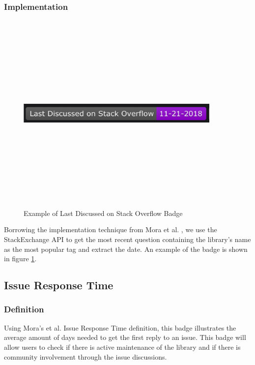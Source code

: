 \documentclass[12pt, letterpaper]{article}
\begin{document}
\subsubsection{Implementation}

\begin{figure}[!htb]
    \centerline{
        \includegraphics[width=10cm,height=10cm,keepaspectratio=true]{lastdiscussedbadge}
    }
    \caption{
        Example of Last Discussed on Stack Overflow Badge
    }
    \label{lastdiscussed}
\end{figure}

Borrowing the implementation technique from Mora et al. \cite{metrics}, we use the StackExchange API \cite{stackexchangeapi}
to get the most recent question containing the library's name as the most popular tag
and extract the date. An example of the badge is shown in figure \ref{lastdiscussed}.

\subsection{Issue Response Time}
\subsubsection{Definition}
Using Mora's et al. \cite{metrics} Issue Response Time definition, this badge illustrates the average
amount of days needed to get the first reply to an issue. 
This badge will allow users to check if there is active maintenance of the library and if there is community 
involvement
through the issue discussions. 
\end{document}
